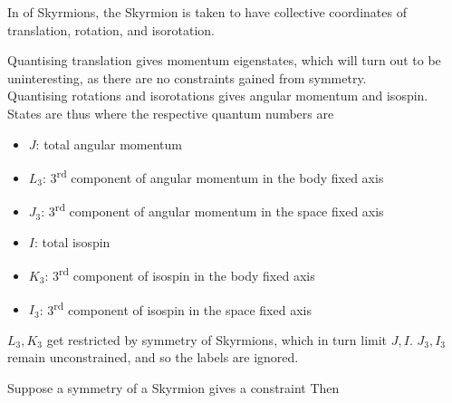 \documentclass{article}
\begin{document}
\begin{definition}
In  of Skyrmions, the Skyrmion is taken to have collective coordinates of translation, rotation, and isorotation. 
\end{definition}
Quantising translation gives momentum eigenstates, which will turn out to be uninteresting, as there are no constraints gained from symmetry. \\
Quantising rotations and isorotations gives angular momentum and isospin. States are thus 
where the respective quantum numbers are 
\begin{itemize}
    \item $J$: total angular momentum 
    \item $L_3$: 3\textsuperscript{rd} component of angular momentum in the body fixed axis
    \item $J_3$: 3\textsuperscript{rd} component of angular momentum in the space fixed axis 
    \item $I$: total isospin 
    \item $K_3$: 3\textsuperscript{rd} component of isospin in the body fixed axis
    \item $I_3$: 3\textsuperscript{rd} component of isospin in the space fixed axis 
\end{itemize}
$L_3, K_3$ get restricted by symmetry of Skyrmions, which in turn limit $J,I$. $J_3,I_3$ remain unconstrained, and so the labels are ignored. 

\begin{prop}
Suppose a symmetry of a Skyrmion gives a constraint 
Then 
\end{prop}
\end{document}
